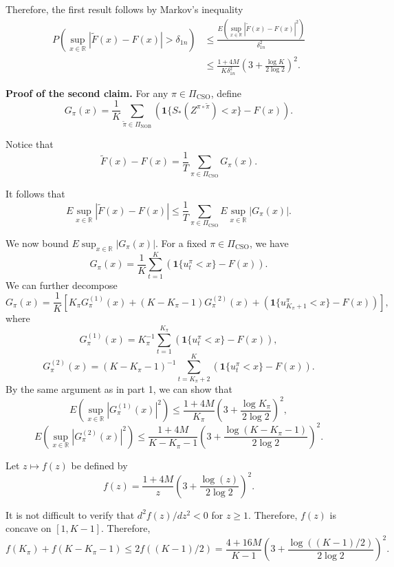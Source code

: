 \documentclass[final,12pt]{colt2018} %
\begin{document}
Therefore, the first result follows by Markov's inequality 
\begin{align*}
P\left(\sup_{x\in\mathbb{R}}\left|\tilde{F}(x)-F(x)\right|>\delta_{1n}\right) & \leq\frac{E\left(\sup_{x\in\mathbb{R}}\left|\tilde{F}(x)-F(x)\right|^{2}\right)}{\delta_{1n}^{2}}\\
 & \le\frac{1+4M}{K\delta_{1n}^{2}}\left(3+\frac{\log K}{2\log2}\right)^{2}.
\end{align*}

\textbf{Proof of the second claim.} For any $\pi\in\Pi_{\text{CSO}}$, define 
\[
G_{\pi}(x)=\frac{1}{K}\sum_{\tilde{\pi}\in\Pi_{\text{NOB}}}\left(\mathbf{1}\{S_{*}(Z^{\pi\circ \tilde{\pi}})<x\}-F(x)\right).
\]

Notice that 
\[
\tilde{F}(x)-F(x)=\frac{1}{T}\sum_{\pi\in\Pi_{\text{CSO}}}G_{\pi}(x).
\]

It follows that 
\begin{equation}
E\sup_{x\in\mathbb{R}}\left|\tilde{F}(x)-F(x)\right|\leq\frac{1}{T}\sum_{\pi\in\Pi_{\text{CSO}}}E\sup_{x\in\mathbb{R}}\left|G_{\pi}(x)\right|.\label{eq: ergodicity eq 2}
\end{equation}

We now bound $E\sup_{x\in\mathbb{R}}\left|G_{\pi}(x)\right|$. For
a fixed $\pi\in\Pi_{\text{CSO}}$, we have
$$G_{\pi}(x)=\frac{1}{K}\sum_{t=1}^{K}\left(\mathbf{1}\{u_{t}^{\pi}<x\}-F(x)\right).
$$
We can further decompose $$
G_{\pi}(x)=\frac{1}{K}\left[K_{\pi}G_{\pi}^{(1)}(x)+(K-K_{\pi}-1)G_{\pi}^{(2)}(x)+\left(\mathbf{1}\{u_{K_{\pi}+1}^{\pi}<x\}-F(x)\right)\right],$$
where $$G_{\pi}^{(1)}(x)=K_{\pi}^{-1}\sum_{t=1}^{K_{\pi}}\left(\mathbf{1}\{u_{t}^{\pi}<x\}-F(x)\right),$$
$$G_{\pi}^{(2)}(x)=(K-K_{\pi}-1)^{-1}\sum_{t=K_{\pi}+2}^{K}\left(\mathbf{1}\{u_{t}^{\pi}<x\}-F(x)\right).$$
By the same argument as in part 1, we can show that $$
E\left(\sup_{x\in\mathbb{R}}\left|G_{\pi}^{(1)}(x)\right|^{2}\right)\leq\frac{1+4M}{K_{\pi}}\left(3+\frac{\log K_{\pi}}{2\log2}\right)^{2},
$$$$
E\left(\sup_{x\in\mathbb{R}}\left|G_{\pi}^{(2)}(x)\right|^{2}\right)\leq\frac{1+4M}{K-K_{\pi}-1}\left(3+\frac{\log(K-K_{\pi}-1)}{2\log2}\right)^{2}.
$$

Let $z\mapsto f(z)$ be defined by 
\[
f(z)=\frac{1+4M}{z}\left(3+\frac{\log(z)}{2\log2}\right)^{2}.
\]

It is not difficult to verify that $d^{2}f(z)/dz^{2}<0$ for $z\geq1$.
Therefore, $f(z)$ is concave on $[1,K-1]$. Therefore, 
\[
f(K_{\pi})+f(K-K_{\pi}-1)\leq2f((K-1)/2)=\frac{4+16M}{K-1}\left(3+\frac{\log((K-1)/2)}{2\log2}\right)^{2}.
\]
\end{document}
